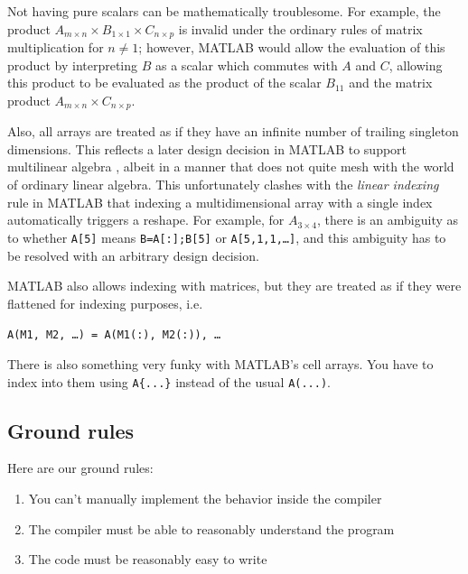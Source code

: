 \documentclass[preprint]{sigplanconf}
\newcommand{\MATLAB}{\textsc{MATLAB}}
\begin{document}
Not having pure scalars can be mathematically troublesome. For example, the product $A_{m\times n} \times B_{1\times 1} \times C_{n\times p}$ is invalid under the ordinary rules of matrix multiplication for $n\ne1$; however, \MATLAB{} would allow the evaluation of this product by interpreting $B$ as a scalar which commutes with $A$ and $C$, allowing this product to be evaluated as the product of the scalar $B_{11}$ and the matrix product $A_{m\times n} \times C_{n\times p}$.


Also, all arrays are treated as if they have an infinite number of trailing singleton dimensions. This reflects a later design decision in \MATLAB{} to support multilinear algebra \cite{matlabman:ma},  albeit in a manner that does not quite mesh with the world of ordinary linear algebra. This unfortunately clashes with the \textit{linear indexing} rule in \MATLAB{} that indexing a multidimensional array with a single index automatically triggers a reshape. For example, for $A_{3\times4}$, there is an ambiguity as to whether \texttt{A[5]} means \texttt{B=A[:];B[5]} or \texttt{A[5,1,1,\dots]}, and this ambiguity has to be resolved with an arbitrary design decision.

\MATLAB{} also allows indexing with matrices, but they are treated as if they were flattened for indexing purposes, i.e.

\texttt{A(M1, M2, \dots) = A(M1(:), M2(:)), \dots}

There is also something very funky with \MATLAB's cell arrays. You have to index into them using \texttt{A\{...\}} instead of the usual \texttt{A(...)}.


\subsection{Ground rules}
Here are our ground rules:

\begin{enumerate}
\item You can't manually implement the behavior inside the compiler
\item The compiler must be able to reasonably understand the program
\item The code must be reasonably easy to write
\end{enumerate}
\end{document}
